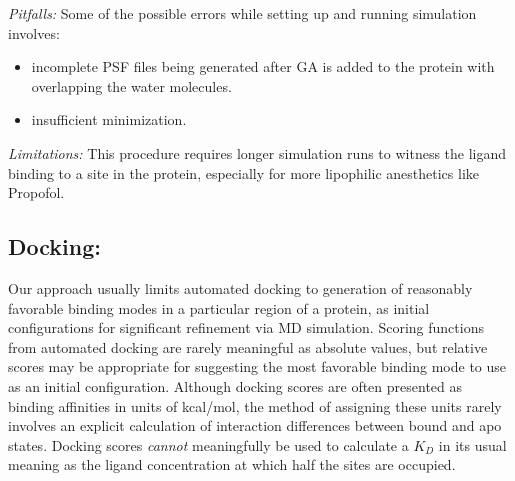 \documentclass[12pt]{article}
\begin{document}
\textit {Pitfalls:}
	Some of the possible errors while setting up and running simulation involves:
	\begin{itemize}
	 \item incomplete PSF files being generated after GA is added to the protein with overlapping the water molecules. 
	 \item insufficient minimization.
	 \end{itemize}

 \textit {Limitations:}
 This procedure requires longer simulation runs to witness the ligand binding to a site in the protein, especially for more lipophilic anesthetics like Propofol.  
 
\subsection{Docking:} Our approach usually limits automated docking to generation of reasonably favorable binding modes in a particular region of a protein, as initial configurations for significant refinement via MD simulation.  Scoring functions from automated docking are rarely meaningful as absolute values, but relative scores may be appropriate for suggesting the most favorable binding mode to use as an initial configuration.  Although docking scores are often presented as binding affinities in units of kcal/mol, the method of assigning these units rarely involves an explicit calculation of interaction differences between bound and apo states.  Docking scores \emph{cannot} meaningfully be used to calculate a $K_{D}$ in its usual meaning as the ligand concentration at which half the sites are occupied.  
\end{document}
